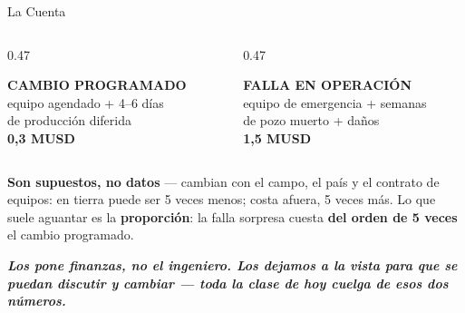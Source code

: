 \documentclass[aspectratio=169, 11pt]{beamer}
\begin{document}
\begin{frame}[shrink=14]{La Cuenta}
  \vspace{2pt}
  \begin{columns}[T]
    \begin{column}{0.47\textwidth}
      \begin{tcolorbox}[colback=arcaGray, colframe=codeBlue, boxrule=0pt,
        leftrule=4pt, arc=3pt, left=9pt, right=9pt, top=7pt, bottom=7pt]
        {\scriptsize\color{codeBlue}\bfseries CAMBIO PROGRAMADO}\\[6pt]
        {\footnotesize\color{textMuted}
         equipo agendado + 4--6 días\\de producción diferida\\[7pt]}
        {\Large\color{codeBlue}\bfseries 0,3 MUSD}
      \end{tcolorbox}
    \end{column}
    \begin{column}{0.47\textwidth}
      \begin{tcolorbox}[colback=arcaGray, colframe=arcaRed, boxrule=0pt,
        leftrule=4pt, arc=3pt, left=9pt, right=9pt, top=7pt, bottom=7pt]
        {\scriptsize\color{arcaRed}\bfseries FALLA EN OPERACIÓN}\\[6pt]
        {\footnotesize\color{textMuted}
         equipo de emergencia + semanas\\de pozo muerto + daños\\[7pt]}
        {\Large\color{arcaRed}\bfseries 1,5 MUSD}
      \end{tcolorbox}
    \end{column}
  \end{columns}
  \vspace{9pt}
  {\footnotesize\color{textMuted}
   \textbf{Son supuestos, no datos} --- cambian con el campo, el país y el
   contrato de equipos: en tierra puede ser 5 veces menos; costa afuera,
   5 veces más. Lo que suele aguantar es la \textbf{proporción}: la falla
   sorpresa cuesta \textbf{del orden de 5 veces} el cambio programado.}
  \vspace{5pt}

  {\footnotesize\color{arcaDark}\bfseries\itshape
   Los pone finanzas, no el ingeniero. Los dejamos a la vista para que se
   puedan discutir y cambiar --- toda la clase de hoy cuelga de esos dos
   números.}
\end{frame}
\end{document}
